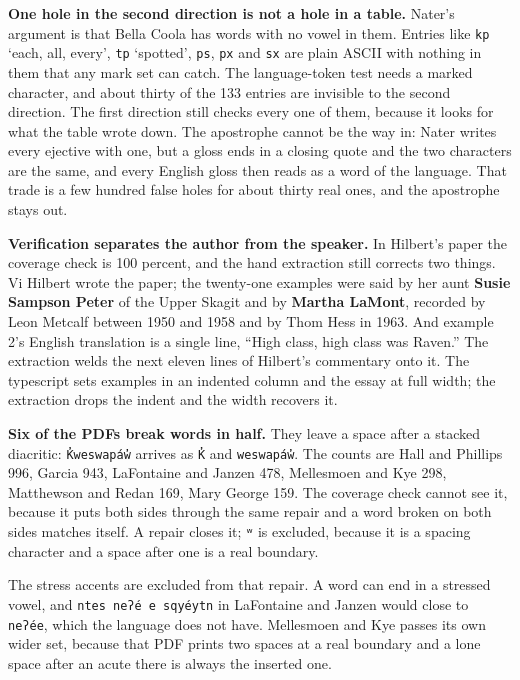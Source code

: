 \textbf{One hole in the second direction is not a hole in a table.} Nater's argument is that Bella Coola has words with no vowel in them. Entries like \texttt{kp} `each, all, every', \texttt{tp} `spotted', \texttt{ps}, \texttt{px} and \texttt{sx} are plain ASCII with nothing in them that any mark set can catch. The language-token test needs a marked character, and about thirty of the 133 entries are invisible to the second direction. The first direction still checks every one of them, because it looks for what the table wrote down. The apostrophe cannot be the way in: Nater writes every ejective with one, but a gloss ends in a closing quote and the two characters are the same, and every English gloss then reads as a word of the language. That trade is a few hundred false holes for about thirty real ones, and the apostrophe stays out.

\textbf{Verification separates the author from the speaker.} In Hilbert's paper \cite{src:Hilbert-1983} the coverage check is 100 percent, and the hand extraction still corrects two things. Vi Hilbert wrote the paper; the twenty-one examples were said by her aunt \textbf{Susie Sampson Peter} of the Upper Skagit and by \textbf{Martha LaMont}, recorded by Leon Metcalf between 1950 and 1958 and by Thom Hess in 1963. And example 2's English translation is a single line, ``High class, high class was Raven.'' The extraction welds the next eleven lines of Hilbert's commentary onto it. The typescript sets examples in an indented column and the essay at full width; the extraction drops the indent and the width recovers it.

\textbf{Six of the PDFs break words in half.} They leave a space after a stacked diacritic: \texttt{K̓weswapáw̓} arrives as \texttt{K̓} and \texttt{weswapáw̓}. The counts are Hall and Phillips 996, Garcia 943, LaFontaine and Janzen 478, Mellesmoen and Kye 298, Matthewson and Redan 169, Mary George 159. The coverage check cannot see it, because it puts both sides through the same repair and a word broken on both sides matches itself. A repair closes it; \texttt{ʷ} is excluded, because it is a spacing character and a space after one is a real boundary.

The stress accents are excluded from that repair. A word can end in a stressed vowel, and \texttt{ntes neʔé e sqyéytn} in LaFontaine and Janzen would close to \texttt{neʔée}, which the language does not have. Mellesmoen and Kye passes its own wider set, because that PDF prints two spaces at a real boundary and a lone space after an acute there is always the inserted one.

